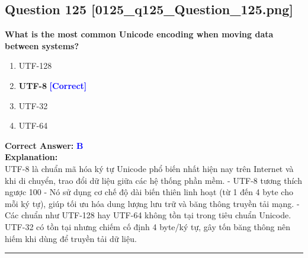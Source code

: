 \documentclass[11pt,a4paper]{article}
\begin{document}
\begin{minipage}{\textwidth}
\subsection*{Question 125 \quad \footnotesize{[0125_q125_Question_125.png]}}
\noindent \textbf{What is the most common Unicode encoding when moving data between systems?}

\begin{enumerate}[label=\Alph*.]
    \item UTF-128
    \item \textbf{UTF-8} \hfill \textcolor{blue}{\textbf{[Correct]}}
    \item UTF-32
    \item UTF-64
\end{enumerate}

\noindent \textbf{Correct Answer:} \textcolor{blue}{\textbf{B}} \\[4pt]
\noindent \textbf{Explanation:}\\
UTF-8 là chuẩn mã hóa ký tự Unicode phổ biến nhất hiện nay trên Internet và khi di chuyển, trao đổi dữ liệu giữa các hệ thống phần mềm.\newline
- UTF-8 tương thích ngược 100%
- Nó sử dụng cơ chế độ dài biến thiên linh hoạt (từ 1 đến 4 byte cho mỗi ký tự), giúp tối ưu hóa dung lượng lưu trữ và băng thông truyền tải mạng.\newline
- Các chuẩn như UTF-128 hay UTF-64 không tồn tại trong tiêu chuẩn Unicode. UTF-32 có tồn tại nhưng chiếm cố định 4 byte/ký tự, gây tốn băng thông nên hiếm khi dùng để truyền tải dữ liệu.
\end{minipage}
\vspace{0.8cm}
\hrule
\vspace{0.5cm}
\end{document}
